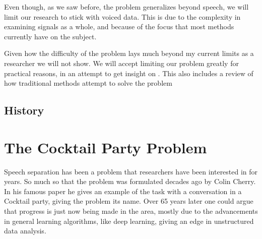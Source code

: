 \documentclass{book}
\begin{document}
\par
Even though, as we saw before, the problem generalizes beyond speech, we will limit our research to stick with voiced data. This is due to the complexity in examining signals as a whole, and because of the focus that most methods currently have on the subject.
\par
Given how the difficulty of the problem lays much beyond my current limits as a researcher we will not show. We will accept limiting our problem greatly for practical reasons, in an attempt to get insight on . This also includes a review of how traditional methods attempt to solve the problem

  \section{History}

\chapter{The Cocktail Party Problem}
\qquad Speech separation has been a problem that researchers have been interested in for years. So much so that the problem was formulated decades ago by Colin Cherry\cite{Cherry}. In his famous paper he gives an example of the task with a conversation in a Cocktail party, giving the problem its name. Over 65 years later one could argue that progress is just now being made in the area, mostly due to the advancements in general learning algorithms, like deep learning, giving an edge in unstructured data analysis.
\end{document}
